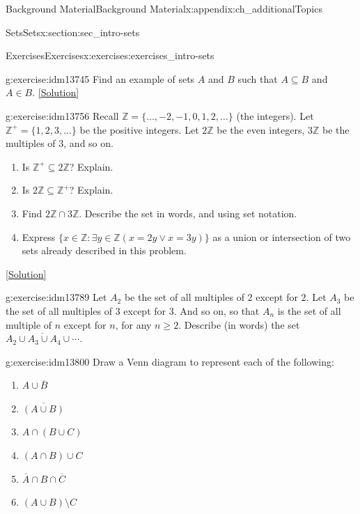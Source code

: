 \documentclass[oneside,10pt,]{book}
\numberwithin{equation}{chapter}
\def\Z{\mathbb Z}
\def\st{:}
\begin{document}
\begin{appendixptx}{Background Material}{}{Background Material}{}{}{x:appendix:ch_additionalTopics}
\begin{sectionptx}{Sets}{}{Sets}{}{}{x:section:sec_intro-sets}
\begin{exercises-subsection}{Exercises}{}{Exercises}{}{}{x:exercises:exercises_intro-sets}
\begin{divisionexercise}{4}{}{}{g:exercise:idm13745}%
Find an example of sets \(A\) and \(B\) such that \(A \subseteq B\) and \(A \in B\).%
\space\hspace*{0pt}\hfill{\tiny\hyperlink{g:solution:idm13752-main}{[Solution]}}\end{divisionexercise}%
\begin{divisionexercise}{5}{}{}{g:exercise:idm13756}%
Recall \(\Z = \{\ldots,-2,-1,0, 1,2,\ldots\}\) (the integers). Let \(\Z^+ = \{1, 2, 3, \ldots\}\) be the positive integers. Let \(2\Z\) be the even integers, \(3\Z\) be the multiples of 3, and so on.%
\par
%
\begin{enumerate}[label=(\alph*)]
\item{}Is \(\Z^+ \subseteq 2\Z\)? Explain.%
\item{}Is \(2\Z \subseteq \Z^+\)? Explain.%
\item{}Find \(2\Z \cap 3\Z\). Describe the set in words, and using set notation.%
\item{}Express \(\{x \in \Z \st \exists y\in \Z (x = 2y \vee x = 3y)\}\) as a union or intersection of two sets already described in this problem.%
\end{enumerate}
%
\space\hspace*{0pt}\hfill{\tiny\hyperlink{g:solution:idm13777-main}{[Solution]}}\end{divisionexercise}%
\begin{divisionexercise}{6}{}{}{g:exercise:idm13789}%
Let \(A_2\) be the set of all multiples of 2 except for \(2\). Let \(A_3\) be the set of all multiples of 3 except for 3. And so on, so that \(A_n\) is the set of all multiple of \(n\) except for \(n\), for any \(n \ge 2\). Describe (in words) the set \(\overline{A_2 \cup A_3 \cup A_4 \cup \cdots}\).%
\end{divisionexercise}%
\begin{divisionexercise}{7}{}{}{g:exercise:idm13800}%
Draw a Venn diagram to represent each of the following:%
\begin{enumerate}[label=(\alph*)]
\item{}\(A \cup \overline B\)%
\item{}\(\overline{(A \cup B)}\)%
\item{}\(A \cap (B \cup C)\)%
\item{}\((A \cap B) \cup C\)%
\item{}\(\overline A \cap B \cap \overline C\)%
\item{}\((A \cup B) \setminus C\)%

\end{enumerate}
\end{divisionexercise}
\end{exercises-subsection}
\end{sectionptx}
\end{appendixptx}
\end{document}
